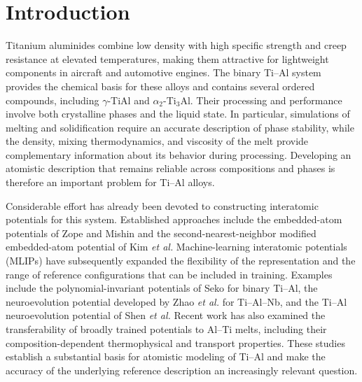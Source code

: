 \section{Introduction}
\label{sec:introduction}

Titanium aluminides combine low density with high specific strength and creep resistance at elevated temperatures, making them attractive for lightweight components in aircraft and automotive engines.\cite{Clemens2013}
The binary Ti--Al system provides the chemical basis for these alloys and contains several ordered compounds, including $\gamma$-TiAl and $\alpha_2$-Ti$_3$Al.
Their processing and performance involve both crystalline phases and the liquid state.
In particular, simulations of melting and solidification require an accurate description of phase stability, while the density, mixing thermodynamics, and viscosity of the melt provide complementary information about its behavior during processing.
Developing an atomistic description that remains reliable across compositions and phases is therefore an important problem for Ti--Al alloys.

Considerable effort has already been devoted to constructing interatomic potentials for this system.
Established approaches include the embedded-atom potentials of Zope and Mishin\cite{Zope2003} and the second-nearest-neighbor modified embedded-atom potential of Kim \textit{et al.}\cite{Kim2016}
Machine-learning interatomic potentials (MLIPs) have subsequently expanded the flexibility of the representation and the range of reference configurations that can be included in training.
Examples include the polynomial-invariant potentials of Seko for binary Ti--Al,\cite{Seko2020} the neuroevolution potential developed by Zhao \textit{et al.} for Ti--Al--Nb,\cite{Zhao2024} and the Ti--Al neuroevolution potential of Shen \textit{et al.}\cite{Shen2025}
Recent work has also examined the transferability of broadly trained potentials to Al--Ti melts, including their composition-dependent thermophysical and transport properties.\cite{Song2024,Kato2026}
These studies establish a substantial basis for atomistic modeling of Ti--Al and make the accuracy of the underlying reference description an increasingly relevant question.

